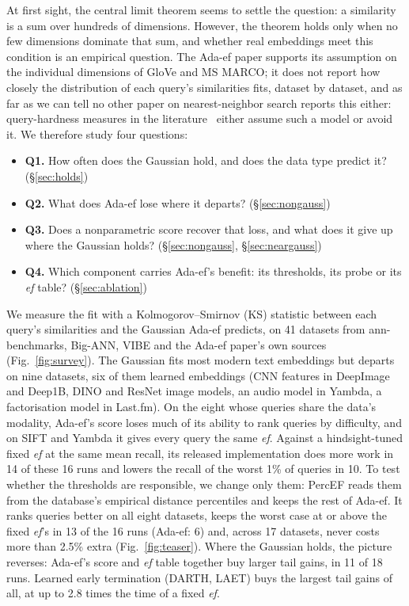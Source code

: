 \documentclass[sigconf,review=false,screen]{acmart}
\newcommand{\ef}{\textit{ef}}
\begin{document}
At first sight, the central limit theorem seems to settle the question: a similarity is a sum over
hundreds of dimensions. However, the theorem holds only when no few dimensions dominate that sum,
and whether real embeddings meet this condition is an empirical question. The Ada-ef paper supports
its assumption on the individual dimensions of GloVe and MS MARCO; it does not report how closely the
distribution of each query's similarities fits, dataset by dataset, and as far as we can tell no
other paper on nearest-neighbor search reports this either: query-hardness measures in the
literature~\cite{he2012difficulty,aumuller2019lid,wang2024steiner} either assume such a model or
avoid it. We therefore study four questions:
\begin{itemize}
\item \textbf{Q1.} How often does the Gaussian hold, and does the data type predict it?
  (\S\ref{sec:holds})
\item \textbf{Q2.} What does Ada-ef lose where it departs? (\S\ref{sec:nongauss})
\item \textbf{Q3.} Does a nonparametric score recover that loss, and what does it give up where the
  Gaussian holds? (\S\ref{sec:nongauss}, \S\ref{sec:neargauss})
\item \textbf{Q4.} Which component carries Ada-ef's benefit: its thresholds, its probe or its \ef{}
  table? (\S\ref{sec:ablation})
\end{itemize}

We measure the fit with a Kolmogorov--Smirnov (KS) statistic between each query's similarities and
the Gaussian Ada-ef predicts, on 41 datasets from ann-benchmarks, Big-ANN, VIBE and the Ada-ef
paper's own sources (Fig.~\ref{fig:survey}). The Gaussian fits most modern text embeddings but
departs on nine datasets, six of them learned embeddings (CNN features in DeepImage and Deep1B, DINO
and ResNet image models, an audio model in Yambda, a factorisation model in Last.fm). On the eight
whose queries share the data's modality, Ada-ef's score loses much of its ability to rank queries
by difficulty, and on SIFT and Yambda it gives every query the same \ef{}. Against a hindsight-tuned
fixed \ef{} at the same mean recall, its released implementation does more work in 14 of these 16
runs and lowers the recall of the worst 1\% of queries in 10. To test whether the thresholds are
responsible, we change only them: PercEF reads them from the database's empirical distance
percentiles and keeps the rest of Ada-ef. It ranks queries better on all eight datasets, keeps the
worst case at or above the fixed \ef{}'s in 13 of the 16 runs (Ada-ef: 6) and, across 17 datasets,
never costs more than 2.5\% extra (Fig.~\ref{fig:teaser}). Where the Gaussian holds, the picture
reverses: Ada-ef's score and \ef{} table together buy larger tail gains, in 11 of 18 runs.
Learned early termination (DARTH, LAET) buys the largest tail gains of all, at up to 2.8 times the
time of a fixed \ef{}.
\end{document}
